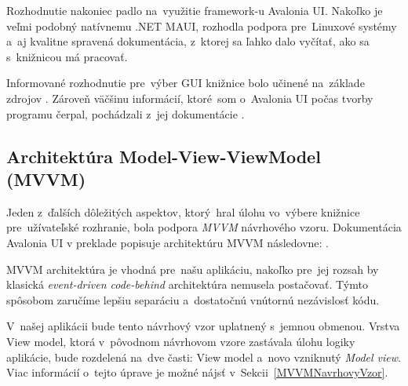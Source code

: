 Rozhodnutie nakoniec padlo na~využitie framework-u Avalonia UI. Nakoľko je veľmi podobný natívnemu .NET MAUI, rozhodla podpora pre~Linuxové systémy a~aj kvalitne spravená dokumentácia, z~ktorej sa ľahko dalo vyčítať, ako sa s~knižnicou má pracovať. 

Informované rozhodnutie pre~výber GUI knižnice bolo učinené na~základe zdrojov \cite{WpfGuide,WhatIsMAUI,AvaloniaMauiComparison}. Zároveň väčšinu informácií, ktoré~som o~Avalonia UI počas tvorby programu čerpal, pochádzali z~jej dokumentácie \cite{AvaloniaDokumentacia}.

\subsection{Architektúra Model-View-ViewModel (MVVM)}\label{ArchitekturaMVVM}

Jeden z~ďalších dôležitých aspektov, ktorý~hral úlohu vo~výbere knižnice pre~užívateľské rozhranie, bola podpora \textit{MVVM} návrhového vzoru. Dokumentácia Avalonia UI v preklade popisuje architektúru MVVM následovne: \cite{MVVMDefByAvalonia}.


MVVM architektúra je vhodná pre~našu aplikáciu, nakoľko pre~jej rozsah by klasická \textit{event-driven code-behind} architektúra nemusela postačovať. Týmto spôsobom zaručíme lepšiu separáciu a~dostatočnú vnútornú nezávislosť kódu.    

V~našej aplikácii bude tento návrhový vzor uplatnený s~jemnou obmenou. Vrstva View model, ktorá v~pôvodnom návrhovom vzore zastávala úlohu logiky aplikácie, bude rozdelená na~dve časti: View model a~novo vzniknutý \textit{Model view}. Viac informácií o~tejto úprave je možné nájsť v~Sekcii~\ref{MVVMNavrhovyVzor}. 


